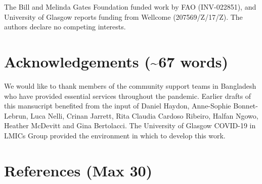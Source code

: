 \documentclass[]{elsarticle} %
\begin{document}
The Bill and Melinda Gates Foundation funded work by FAO (INV-022851), and University of Glasgow reports funding from Wellcome (207569/Z/17/Z).
The authors declare no competing interests.

\hypertarget{acknowledgements-67-words}{%
\section{Acknowledgements (\textasciitilde67 words)}\label{acknowledgements-67-words}}

We would like to thank members of the community support teams in Bangladesh who have provided essential services throughout the pandemic.
Earlier drafts of this mansucript benefited from the input of Daniel Haydon, Anne-Sophie Bonnet-Lebrun, Luca Nelli, Crinan Jarrett, Rita Claudia Cardoso Ribeiro, Halfan Ngowo, Heather McDevitt and Gina Bertolacci.
The University of Glasgow COVID-19 in LMICs Group provided the environment in which to develop this work.

\hypertarget{references-max-30}{%
\section*{References (Max 30)}\label{references-max-30}}
\end{document}
